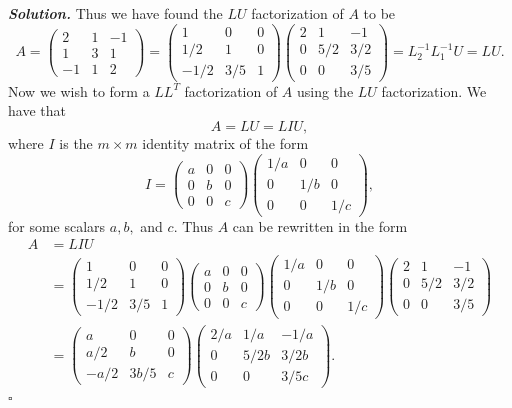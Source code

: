 \documentclass[12pt]{report}
\newenvironment{solution}[1][\it{Solution}]{\textbf{#1. } }{$\square$}
\begin{document}
\begin{solution}
    Thus we have found the $LU$ factorization of $A$ to be
    \[A = \begin{pmatrix} 2 & 1 & -1 \\ 1 & 3 & 1 \\ -1 & 1 & 2 \end{pmatrix} = \begin{pmatrix}1&0&0\\1/2&1&0\\-1/2&3/5&1\end{pmatrix}\begin{pmatrix}2&1&-1\\ 0&5/2&3/2\\ 0&0&3/5\end{pmatrix} = L_2^{-1}L_1^{-1}U=LU.\]
    Now we wish to form a $LL^T$ factorization of $A$ using the $LU$ factorization. We have that 
    \[A = LU = LIU,\]
    where $I$ is the $m \times m$ identity matrix of the form
    \[I = \begin{pmatrix}
        a&0&0\\0&b&0\\0&0&c
    \end{pmatrix}\begin{pmatrix}
        1/a&0&0\\0&1/b&0\\0&0&1/c
    \end{pmatrix},\]
    for some scalars $a,b,$ and $c$. Thus $A$ can be rewritten in the form
    \begin{align*}
        A &= LIU\\
        &= \begin{pmatrix}1&0&0\\1/2&1&0\\-1/2&3/5&1\end{pmatrix}\begin{pmatrix}
            a&0&0\\0&b&0\\0&0&c
        \end{pmatrix}\begin{pmatrix}
            1/a&0&0\\0&1/b&0\\0&0&1/c
        \end{pmatrix}\begin{pmatrix}2&1&-1\\ 0&5/2&3/2\\ 0&0&3/5\end{pmatrix}\\
        &=\begin{pmatrix}a&0&0\\ a/2&b&0\\ -a/2&3b/5&c\end{pmatrix} \begin{pmatrix}2/a&1/a&-1/a\\ 0&5/2b&3/2b\\ 0&0&3/5c\end{pmatrix}.\\

\end{align*}
\end{solution}
\end{document}
